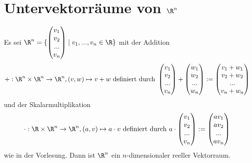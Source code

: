 \section{Untervektorräume von $\R^n$}
Es sei $\R^n=\{\begin{pmatrix} v_1 \\ v_2 \\ ... \\ v_n \end{pmatrix} \mid v_1,...,v_n \in \R \}$ mit der Addition
$$
+: \R^n \times \R^n \to \R^n, (v,w) \mapsto v+w \text{ definiert durch } \begin{pmatrix} v_1 \\ v_2 \\ ... \\ v_n \end{pmatrix}+\begin{pmatrix} w_1 \\ w_2 \\ ... \\ w_n \end{pmatrix}:=\begin{pmatrix} v_1+w_1 \\ v_2+w_2 \\ ... \\ v_n+w_n \end{pmatrix}
$$
und der Skalarmultiplikation
$$
\cdot : \R \times \R^n \to \R^n, (a,v) \mapsto a\cdot v \text{ definiert durch } a \cdot \begin{pmatrix} v_1 \\ v_2 \\ ... \\ v_n \end{pmatrix}:=\begin{pmatrix} a v_1 \\ a v_2 \\ ... \\ a v_n \end{pmatrix}
$$
wie in der Vorlesung. Dann ist $\R^n$ ein $n$-dimensionaler reeller Vektorraum.
\quad\\
